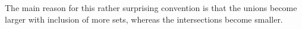 \documentclass[preview]{standalone}
\begin{document}
\begin{center}
The main reason for this rather surprising convention is that the unions become larger with inclusion of more sets, whereas the intersections become smaller.
\end{center}
\end{document}
